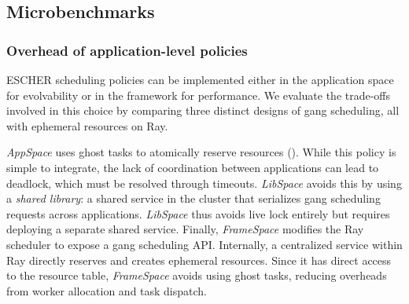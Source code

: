 \subsection{Microbenchmarks}
\subsubsection{Overhead of application-level policies}
\label{sec:eval:gangscheduling}
ESCHER scheduling policies can be implemented either in the application space for evolvability or in the framework for performance.
We evaluate the trade-offs involved in this choice by comparing three distinct designs of gang scheduling, all with ephemeral resources on Ray.

\textit{AppSpace} uses ghost tasks to atomically reserve resources ().
While this policy is simple to integrate, the lack of coordination between applications can lead to deadlock, which must be resolved through timeouts. %
\textit{LibSpace} avoids this by using a \emph{shared library}: a shared service in the cluster that serializes gang scheduling requests across applications.
\textit{LibSpace} thus avoids live lock entirely but requires deploying a separate shared service.
Finally, \textit{FrameSpace} modifies the Ray scheduler to expose a gang scheduling API.
Internally, a centralized service within Ray directly reserves and creates ephemeral resources.
Since it has direct access to the resource table, \textit{FrameSpace} avoids using ghost tasks, reducing overheads from worker allocation and task dispatch.


